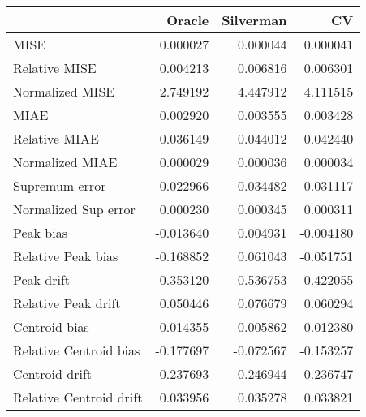 \begin{tabular}{lrrr}
  \toprule
 & Oracle & Silverman & CV \\ 
  \midrule
MISE & 0.000027 & 0.000044 & 0.000041 \\ 
  Relative MISE & 0.004213 & 0.006816 & 0.006301 \\ 
  Normalized MISE & 2.749192 & 4.447912 & 4.111515 \\ 
  MIAE & 0.002920 & 0.003555 & 0.003428 \\ 
  Relative MIAE & 0.036149 & 0.044012 & 0.042440 \\ 
  Normalized MIAE & 0.000029 & 0.000036 & 0.000034 \\ 
  Supremum error & 0.022966 & 0.034482 & 0.031117 \\ 
  Normalized Sup error & 0.000230 & 0.000345 & 0.000311 \\ 
  Peak bias & -0.013640 & 0.004931 & -0.004180 \\ 
  Relative Peak bias & -0.168852 & 0.061043 & -0.051751 \\ 
  Peak drift & 0.353120 & 0.536753 & 0.422055 \\ 
  Relative Peak drift & 0.050446 & 0.076679 & 0.060294 \\ 
  Centroid bias & -0.014355 & -0.005862 & -0.012380 \\ 
  Relative Centroid bias & -0.177697 & -0.072567 & -0.153257 \\ 
  Centroid drift & 0.237693 & 0.246944 & 0.236747 \\ 
  Relative Centroid drift & 0.033956 & 0.035278 & 0.033821 \\ 
   \bottomrule
\end{tabular}
